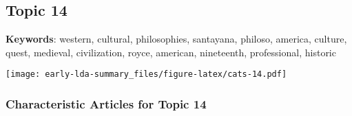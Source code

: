 \documentclass[
]{article}
\begin{document}
\newpage

\hypertarget{topic-14}{%
\subsection{Topic 14}\label{topic-14}}

\textbf{Keywords}: western, cultural, philosophies, santayana, philoso,
america, culture, quest, medieval, civilization, royce, american,
nineteenth, professional, historic

\texttt{[image: early-lda-summary\_files/figure-latex/cats-14.pdf]}
\newpage 

\hypertarget{characteristic-articles-for-topic-14}{%
\subsubsection{Characteristic Articles for Topic
14}\label{characteristic-articles-for-topic-14}}
\end{document}
